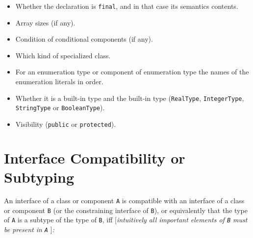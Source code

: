 \begin{itemize}
\begin{itemize}
  \item
    Whether the declaration is \lstinline!final!, and in that case its semantics
    contents.
  \item
    Array sizes (if any).
  \item
    Condition of conditional components (if any).
  \item
    Which kind of specialized class.
  \item
    For an enumeration type or component of enumeration type the names
    of the enumeration literals in order.
  \item
    Whether it is a built-in type and the built-in type (\lstinline!RealType!,
    \lstinline!IntegerType!, \lstinline!StringType! or \lstinline!BooleanType!).
  \item
    Visibility (\lstinline!public! or \lstinline!protected!).
  \end{itemize}
\end{itemize}

\section{Interface Compatibility or Subtyping}

An interface of a class or component \lstinline!A! is compatible with an interface
of a class or component \lstinline!B! (or the constraining interface of \lstinline!B!), or
equivalently that the type of \lstinline!A! is a subtype of the type of \lstinline!B!, iff
{[}\emph{intuitively all important elements of \lstinline!B! must be present in \lstinline!A!}
{]}\emph{:}

